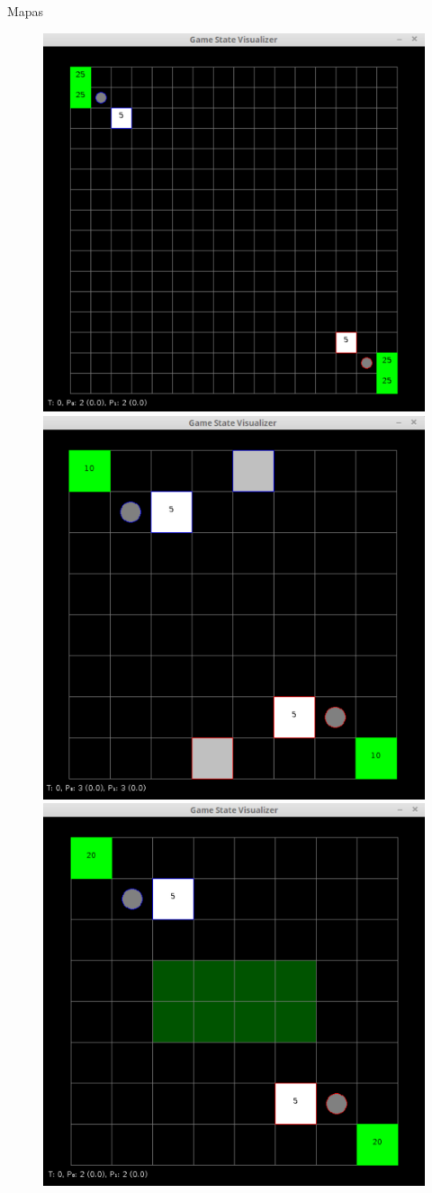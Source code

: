 \documentclass{beamer}
\begin{document}
\begin{frame}{Mapas}
	\begin{figure}[here]
		\includegraphics[width=0.25\linewidth]{fig/map16x16.pdf} \quad
		\includegraphics[width=0.25\linewidth]{fig/map8x8quartel.pdf} \quad
		\includegraphics[width=0.25\linewidth]{fig/map8x8obsta.pdf} 
	\end{figure}
\end{frame}
\end{document}
